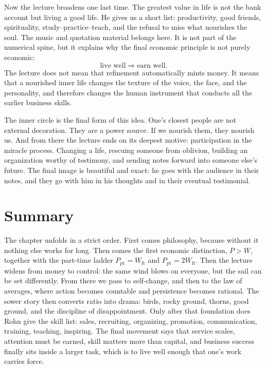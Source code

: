 Now the lecture broadens one last time. The greatest value in life is not the bank account but living a good life. He gives us a short list: productivity, good friends, spirituality, study--practice--teach, and the refusal to miss what nourishes the soul. The music and quotation material belongs here. It is not part of the numerical spine, but it explains why the final economic principle is not purely economic:
\begin{equation}
\text{live well} \Longrightarrow \text{earn well}.
\end{equation}
The lecture does not mean that refinement automatically mints money. It means that a nourished inner life changes the texture of the voice, the face, and the personality, and therefore changes the human instrument that conducts all the earlier business skills.

The inner circle is the final form of this idea. One's closest people are not external decoration. They are a power source. If we nourish them, they nourish us. And from there the lecture ends on its deepest motive: participation in the miracle process. Changing a life, rescuing someone from oblivion, building an organization worthy of testimony, and sending notes forward into someone else's future. The final image is beautiful and exact: he goes with the audience in their notes, and they go with him in his thoughts and in their eventual testimonial.

\section{Summary}

The chapter unfolds in a strict order. First comes philosophy, because without it nothing else works for long. Then comes the first economic distinction, \(P>W\), together with the part-time ladder \(P_{\mathrm{pt}}=W_{\mathrm{ft}}\) and \(P_{\mathrm{pt}}=2W_{\mathrm{ft}}\). Then the lecture widens from money to control: the same wind blows on everyone, but the sail can be set differently. From there we pass to self-change, and then to the law of averages, where action becomes countable and persistence becomes rational. The sower story then converts ratio into drama: birds, rocky ground, thorns, good ground, and the discipline of disappointment. Only after that foundation does Rohn give the skill list: sales, recruiting, organizing, promotion, communication, training, teaching, inspiring. The final movement says that service scales, attention must be earned, skill matters more than capital, and business success finally sits inside a larger task, which is to live well enough that one's work carries force.
